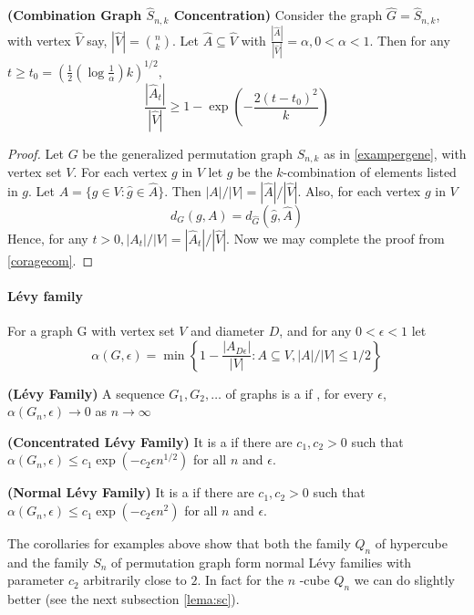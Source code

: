 \documentclass{article}
\newcommand{\bfs}[1]{\textbf{({#1})}}
\begin{document}
\begin{cora}{\bfs{Combination Graph $\hat{S}_{n, k}$ Concentration}}\label{coracom}
Consider the graph $\hat{ G }=\hat{ S }_{ n , k}$, with vertex $\hat{ V }$ say, $|\hat{ V }|=\binom{n}{k}$.
Let $\hat{ A } \subseteq \hat{ V }$ with $\frac{|\hat{ A }| }{|\hat{ V }|}=\alpha, 0<\alpha<1 .$ Then for any $t \geq t_{0}=\left(\frac{1}{2}\left(\log \frac{1}{\alpha}\right) k\right)^{1 / 2}$,
$$
\frac{\left|\hat{A}_{t}\right|}{|\hat{V}|} \geq 1-\exp \left(-\frac{2\left(t-t_{0}\right)^{2}}{k}\right)
$$
\end{cora}
\begin{proof}
Let $G$ be the generalized permutation graph  $S_{n, k}$ as in \cref{exampergene}, with vertex set $V$. For each vertex $g$ in $V$ let $g$ be the $k$-combination of elements listed in $g$. Let $A =\{ g \in V : \hat{ g } \in \hat{ A }\}$. Then $| A | /| V |=|\hat{ A }| /|\hat{ V }| .$ Also, for each vertex $g$ in $V$
$$
d _{ G }( g , A )= d _{\hat{ G }}(\hat{ g }, \hat{ A })
$$
Hence, for any $t>0,\left|A_{t}\right| /|V|=\left|\hat{A}_{t}\right| /|\hat{V}| .$ Now we may complete the proof from \cref{coragecom}.
\end{proof}

\paragraph{L\'{e}vy family}

For a graph G with vertex set $V$ and diameter $D$, and for any $0<\epsilon<1$ let
$$\alpha(G, \epsilon)=\min \left\{1-\frac{\left|A_{D\epsilon }\right|}{| V |}: A \subseteq V ,| A | /| V | \leq 1 / 2\right\}
$$
\begin{defa}{\bfs{L\'{e}vy Family}}
A sequence $G _{1}, G _{2}, \ldots$ of graphs is a  if , for every $\epsilon$, $\alpha\left(G _{ n }, \epsilon\right) \to 0$ as $n \rightarrow \infty$
\end{defa}
\begin{defa}{\bfs{Concentrated L\'{e}vy Family}}
It is a  if there are $c_{1}, c_{2}>0$ such that
$\alpha\left(G_{n}, \epsilon\right) \leq c_{1} \exp \left(-c_{2} \epsilon n^{1 / 2}\right)$ for all $n$ and $\epsilon .$ 
\end{defa}

\begin{defa}{\bfs{Normal L\'{e}vy Family}}\label{defnolevy}
It is a  if there are $c_{1}, c_{2}>0$ such that
$\alpha\left(G_{n}, \epsilon\right) \leq c_{1} \exp \left(-c_{2} \epsilon n^{2}\right)$ for all $n$ and $\epsilon .$ 
\end{defa}
\begin{rema}
The corollaries for examples above show that both the family $Q_{n}$ of hypercube  and the family $S_{ n }$ of permutation graph form normal L\'{e}vy families with parameter $c_{2}$ arbitrarily close to $2$. In fact for the $n$ -cube $Q_{n}$ we can do slightly better (see the next subsection \cref{lema:sc}).
\end{rema}
 
\end{document}
